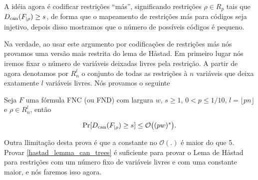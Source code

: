 A idéia agora é codificar restrições ``más'', significando restrições $\rho \in R_{p}$ tais que $D_{\text{can}}(F_{\lvert \rho}) \geq s$, de forma que o mapeamento de restrições más para códigos seja injetivo, depois disso mostramos que o número de possíveis códigos é pequeno. 

Na verdade, ao usar este argumento por codificações de restrições más nós provamos uma versão mais restrita do lema de Håstad. Em primeiro lugar nós iremos fixar o número de variáveis deixadas livres pela restrição. A partir de agora denotamos por $R_{n}^{l}$ o conjunto de todas as restrições à $n$ variáveis que deixa exatamente $l$ variáveis livres. Nós provamos o seguinte

\begin{lema} \label{hastad_lemma_can_trees}

Seja $F$ uma fórmula FNC (ou FND) com largura $w$, $s \geq 1$, $0 < p \leq 1/10$, $l = \lfloor pn \rfloor$ e $\rho \in R_{n}^{l}$, então

\begin{equation*}
	\Pr[D_{\text{can}}(F_{\lvert \rho}) \geq s] \leq \mathcal{O}\big((pw)^{s}\big).
\end{equation*}

\end{lema}

Outra llimitação desta prova é que a constante no $\mathcal{O}(.)$ é maior do que 5. Provar \ref{hastad_lemma_can_trees} é suficiente para provar o Lema de Håstad para restrições com um número fixo de variáveis livres e com uma constante maior, e nós faremos isso agora.

